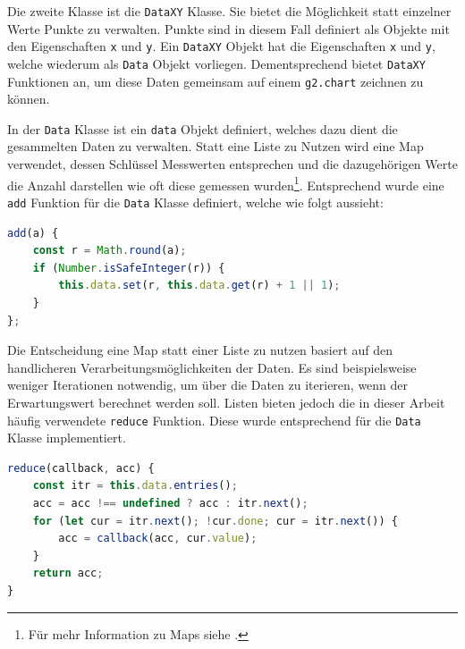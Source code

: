Die zweite Klasse ist die \lstinline{DataXY} Klasse.
Sie bietet die Möglichkeit statt einzelner Werte Punkte zu verwalten.
Punkte sind in diesem Fall definiert als Objekte mit den Eigenschaften \lstinline{x} und \lstinline{y}.
Ein \lstinline{DataXY} Objekt hat die Eigenschaften \lstinline{x} und \lstinline{y}, welche wiederum als \lstinline{Data} Objekt vorliegen.
Dementsprechend bietet \lstinline{DataXY} Funktionen an, um diese Daten gemeinsam auf einem \lstinline{g2.chart} zeichnen zu können.

In der \lstinline{Data} Klasse ist ein \lstinline{data} Objekt definiert, welches dazu dient die gesammelten Daten zu verwalten.
Statt eine Liste zu Nutzen wird eine Map verwendet, dessen Schlüssel Messwerten entsprechen und die dazugehörigen Werte die Anzahl darstellen wie oft diese gemessen wurden\footnote{Für mehr Information zu Maps siehe .}.
Entsprechend wurde eine \lstinline{add} Funktion für die \lstinline{Data} Klasse definiert, welche wie folgt aussieht:

\begin{lstlisting}[language=JavaScript, caption={Definition der \lstinline{add} Funktion, welche dazu genutzt wird der \lstinline{Data} Klasse neue Werte hinzuzufügen}, label={lst:data_add}]
add(a) {
    const r = Math.round(a);
    if (Number.isSafeInteger(r)) {
        this.data.set(r, this.data.get(r) + 1 || 1);
    }
};
\end{lstlisting}

Die Entscheidung eine Map statt einer Liste zu nutzen basiert auf den handlicheren Verarbeitungsmöglichkeiten der Daten.
Es sind beispielsweise weniger Iterationen notwendig, um über die Daten zu iterieren, wenn der Erwartungswert berechnet werden soll.
Listen bieten jedoch die in dieser Arbeit häufig verwendete \lstinline{reduce} Funktion.
Diese wurde entsprechend für die \lstinline{Data} Klasse implementiert.

\begin{lstlisting}[language=JavaScript, caption={Definition der \lstinline{reduce} Funktion, um die Standardfunktion der Liste nachzubilden}, label={lst:data_reduce}]
reduce(callback, acc) {
    const itr = this.data.entries();
    acc = acc !== undefined ? acc : itr.next();
    for (let cur = itr.next(); !cur.done; cur = itr.next()) {
        acc = callback(acc, cur.value);
    }
    return acc;
}
\end{lstlisting}

